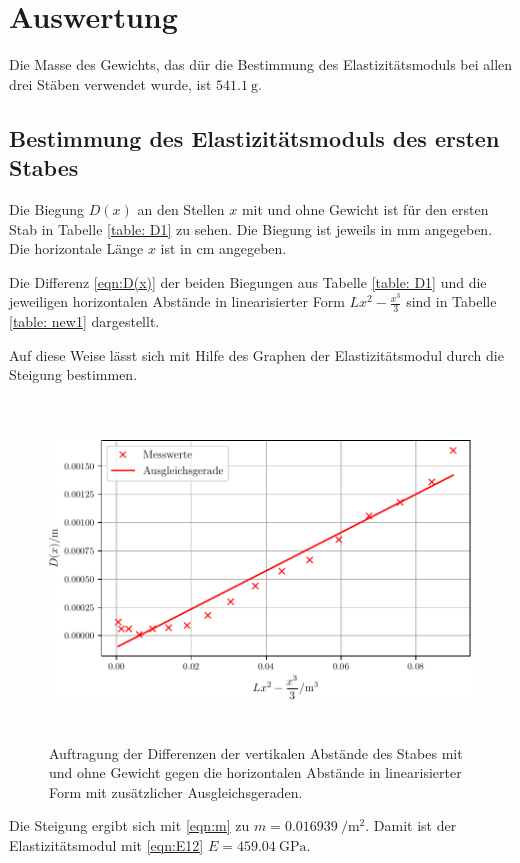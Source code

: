 \newpage
\section{Auswertung}
\label{sec:Auswertung}
Die Masse des Gewichts, das dür die Bestimmung des
Elastizitätsmoduls bei allen drei Stäben verwendet
wurde, ist $\SI{541.1}{\gram}$.
\subsection{Bestimmung des Elastizitätsmoduls des ersten Stabes}

Die Biegung $D(x)$ an den Stellen $x$ mit und ohne Gewicht
ist für den ersten Stab in Tabelle \ref{table: D1} zu sehen. Die Biegung ist
jeweils in $\si{\mm}$ angegeben.
Die horizontale Länge $x$ ist in $\si{\cm}$ angegeben.

\noindent Die Differenz \eqref{eqn:D(x)} der beiden Biegungen aus Tabelle \ref{table: D1} 
und die jeweiligen horizontalen Abstände in linearisierter Form $Lx^2-\frac{x^3}{3}$
sind in Tabelle \ref{table: new1} dargestellt.


\noindent Auf diese Weise lässt sich mit Hilfe des Graphen %
der Elastizitätsmodul durch die Steigung bestimmen.
\begin{figure}
  \centering
  \includegraphics[width=12cm, height=9cm]{./plots/Stange1.pdf}
  \caption{Auftragung der Differenzen der vertikalen Abstände des Stabes mit und ohne Gewicht gegen die horizontalen Abstände in linearisierter Form mit zusätzlicher Ausgleichsgeraden.}
  \label{fig:plot1}
\end{figure}
\noindent Die Steigung ergibt sich mit \eqref{eqn:m}
zu $m = \SI[per-mode=fraction]{0.016939}{\per\square\meter}$. Damit ist der Elastizitätsmodul mit \eqref{eqn:E12}%
$E = \SI{459.04}{\giga\pascal}$.
\newpage

